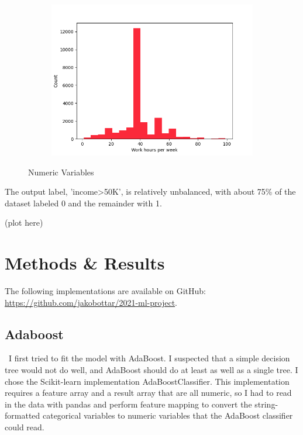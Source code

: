 \documentclass{article}
\begin{document}
\begin{figure}[H]
\begin{subfigure}{0.3\textwidth}
    \end{subfigure}
    \begin{subfigure}{0.3\textwidth}
        \includegraphics[width=\linewidth,]{img/hours-per-week.png}
    \end{subfigure}

    \caption{Numeric Variables}
    \label{fig:num_vars}
\end{figure}

The output label, 'income>50K', is relatively unbalanced, with about 75\% of the dataset labeled 0 and the remainder with 1. 

(plot here)

\section{Methods \& Results}

The following implementations are available on GitHub: \href{https://github.com/jakobottar/2021-ml-project}{https://github.com/jakobottar/2021-ml-project}.

\subsection{Adaboost}
\
I first tried to fit the model with AdaBoost. I suspected that a simple decision tree would not do well, and AdaBoost should do at least as well as a single tree. I chose the Scikit-learn implementation AdaBoostClassifier. This implementation requires a feature array and a result array that are all numeric, so I had to read in the data with pandas and perform feature mapping to convert the string-formatted categorical variables to numeric variables that the AdaBoost classifier could read. 
\end{document}
